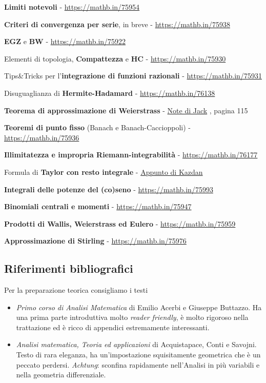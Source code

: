 \documentclass[a4paper,twoside]{article}
\theoremstyle{definition}
\numberwithin{theorem}{section}
\begin{document}
\textbf{Limiti notevoli} - \url{https://mathb.in/75954}

\textbf{Criteri di convergenza per serie}, in breve - \url{https://mathb.in/75938}

\textbf{EGZ} e \textbf{BW} - \url{https://mathb.in/75922}

Elementi di topologia, \textbf{Compattezza} e \textbf{HC} - \url{https://mathb.in/75930}

Tips\&Tricks per l'\textbf{integrazione di funzioni razionali} - \url{https://mathb.in/75931}

Disuguaglianza di \textbf{Hermite-Hadamard} - \url{https://mathb.in/76138}

\textbf{Teorema di approssimazione di Weierstrass} - \href{https://drive.google.com/file/d/1QKCejQNSohMTlZs-MPRndxo5tJ8H48Ez/view?usp=sharing}{Note di Jack} , pagina 115

\textbf{Teoremi di punto fisso} (Banach e Banach-Caccioppoli) - \url{https://mathb.in/75936}

\textbf{Illimitatezza e impropria Riemann-integrabilità} - \url{https://mathb.in/76177}

Formula di \textbf{Taylor con resto integrale} - \href{https://www2.math.upenn.edu/~kazdan/361F15/Notes/Taylor-integral.pdf}{Appunto di Kazdan}

\textbf{Integrali delle potenze del (co)seno} - \url{https://mathb.in/75993}

\textbf{Binomiali centrali e momenti} - \url{https://mathb.in/75947}

\textbf{Prodotti di Wallis, Weierstrass ed Eulero} - \url{https://mathb.in/75959}

\textbf{Approssimazione di Stirling} - \url{https://mathb.in/75976}


\subsection{Riferimenti bibliografici}

Per la preparazione teorica consigliamo i testi
\begin{itemize}
 \item \emph{Primo corso di Analisi Matematica} di Emilio Acerbi e Giuseppe Buttazzo. Ha una prima parte introduttiva molto \emph{reader friendly}, è molto rigoroso nella trattazione ed è ricco di appendici estremamente interessanti.
 \item \emph{Analisi matematica, Teoria ed applicazioni} di Acquistapace, Conti e Savojni. Testo di rara eleganza, ha un'impostazione squisitamente geometrica che è un peccato perdersi. \emph{Achtung}: sconfina rapidamente nell'Analisi in più variabili e nella geometria differenziale.
\end{itemize}
\end{document}
